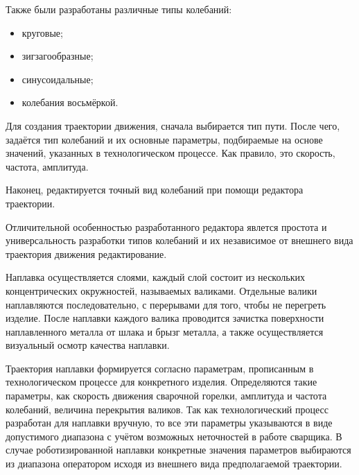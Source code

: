 Также были разработаны различные типы колебаний:

\begin{itemize}
    \item круговые;
    \item зигзагообразные;
    \item синусоидальные;
    \item колебания восьмёркой.
\end{itemize}

Для создания траектории движения, сначала выбирается тип пути.
После чего, задаётся тип колебаний и их основные параметры, подбираемые на основе значений, указанных в технологическом процессе.
Как правило, это скорость, частота, амплитуда.

Наконец, редактируется точный вид колебаний при помощи редактора траектории.

Отличительной особенностью разработанного редактора явлется простота и универсальность разработки типов колебаний и их независимое от внешнего вида траектория движения редактирование.

Наплавка осуществляется слоями, каждый слой состоит из нескольких концентрических окружностей, называемых валиками.
Отдельные валики наплавляются последовательно, с перерывами для того, чтобы не перегреть изделие.
После наплавки каждого валика проводится зачистка поверхности наплавленного металла от шлака и брызг металла, а также осуществляется визуальный осмотр качества наплавки.

Траектория наплавки формируется согласно параметрам, прописанным в технологическом процессе для конкретного изделия.
Определяются такие параметры, как скорость движения сварочной горелки, амплитуда и частота колебаний, величина перекрытия валиков.
Так как технологический процесс разработан для наплавки вручную, то все эти параметры указываются в виде допустимого диапазона с учётом возможных неточностей в работе сварщика.
В случае роботизированной наплавки конкретные значения параметров выбираются из диапазона оператором исходя из внешнего вида предполагаемой траектории.



